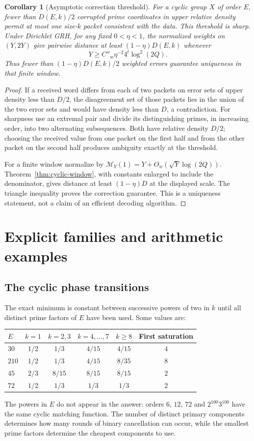 \documentclass[11pt]{article}
\newtheorem{corollary}[theorem]{Corollary}
\theoremstyle{definition}
\theoremstyle{remark}
\begin{document}
\begin{corollary}[Asymptotic correction threshold]\label{cor:correction}
For a cyclic group $X$ of order $E$, fewer than $D(E,k)/2$ corrupted prime coordinates in upper relative density permit at most one size-$k$ packet consistent with the data. This threshold is sharp. Under Dirichlet GRH, for any fixed $0<\eta<1$, the normalized weights on $(Y,2Y)$ give pairwise distance at least $(1-\eta)D(E,k)$ whenever
\[
 Y\ge C''_w\eta^{-2}4^t\log^2(2Q).
\]
Thus fewer than $(1-\eta)D(E,k)/2$ weighted errors guarantee uniqueness in that finite window.
\end{corollary}
\begin{proof}
If a received word differs from each of two packets on error sets of upper density less than $D/2$, the disagreement set of those packets lies in the union of the two error sets and would have density less than $D$, a contradiction. For sharpness use an extremal pair and divide its distinguishing primes, in increasing order, into two alternating subsequences. Both have relative density $D/2$; choosing the received value from one packet on the first half and from the other packet on the second half produces ambiguity exactly at the threshold.

For a finite window normalize by $\mathcal M_Y(1)=Y+O_w(\sqrt Y\log(2Q))$. Theorem~\ref{thm:cyclic-window}, with constants enlarged to include the denominator, gives distance at least $(1-\eta)D$ at the displayed scale. The triangle inequality proves the correction guarantee. This is a uniqueness statement, not a claim of an efficient decoding algorithm.
\end{proof}

\section{Explicit families and arithmetic examples}\label{sec:examples}
\subsection{The cyclic phase transitions}
The exact minimum is constant between successive powers of two in $k$ until all distinct prime factors of $E$ have been used. Some values are:
\begin{center}
\begin{tabular}{@{}lccccc@{}}\toprule
$E$ & $k=1$ & $k=2,3$ & $k=4,\ldots,7$ & $k\ge8$ & First saturation\\\midrule
$30$ & $1/2$ & $1/3$ & $4/15$ & $4/15$ & $4$\\
$210$ & $1/2$ & $1/3$ & $4/15$ & $8/35$ & $8$\\
$45$ & $2/3$ & $8/15$ & $8/15$ & $8/15$ & $2$\\
$72$ & $1/2$ & $1/3$ & $1/3$ & $1/3$ & $2$\\\bottomrule
\end{tabular}
\end{center}
The powers in $E$ do not appear in the answer: orders $6$, $12$, $72$ and $2^{100}3^{100}$ have the same cyclic matching function. The number of distinct primary components determines how many rounds of binary cancellation can occur, while the smallest prime factors determine the cheapest components to use.
\end{document}
